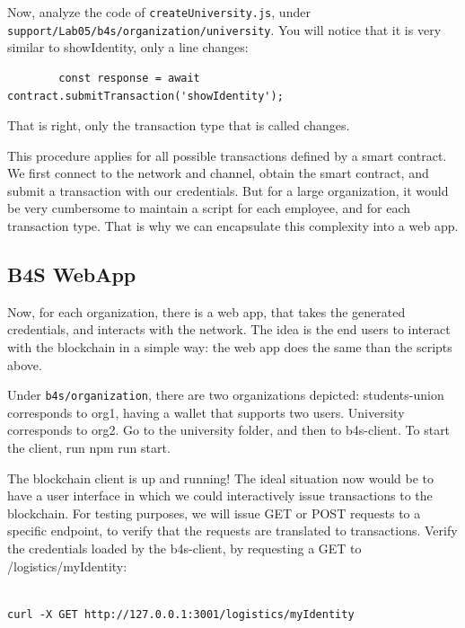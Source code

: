 \documentclass[12pt,a4paper]{article}
\theoremstyle{definition}
\begin{document}
Now, analyze the code of \texttt{createUniversity.js}, under \texttt{support/Lab05/b4s/organization/university}. You will notice that it is very similar to showIdentity, only a line changes:
\begin{verbatim}
        const response = await contract.submitTransaction('showIdentity');
\end{verbatim}

That is right, only the transaction type that is called changes.


This procedure applies for all possible transactions defined by a smart contract. We first connect to the network and channel, obtain the smart contract, and submit a transaction with our credentials. But for a large organization, it would be very cumbersome to maintain a script for each employee, and for each transaction type. That is why we can encapsulate this complexity into a web app.



\subsection{B4S WebApp}
Now, for each organization, there is a web app, that takes the generated credentials, and interacts with the network. The idea is the end users to interact with the blockchain in a simple way: the web app does the same than the scripts above. 

Under \texttt{b4s/organization}, there are two organizations depicted: students-union corresponds to org1, having a wallet that supports two users. University corresponds to org2. Go to the university folder, and then to b4s-client. To start the client, run npm run start. 

The blockchain client is up and running! The ideal situation now would be to have a user interface in which we could interactively issue transactions to the blockchain. For testing purposes, we will issue GET or POST requests to a specific endpoint, to verify that the requests are translated to transactions. Verify the credentials loaded by the b4s-client, by requesting a GET to /logistics/myIdentity:
\begin{verbatim}

curl -X GET http://127.0.0.1:3001/logistics/myIdentity
\end{verbatim}
\end{document}

